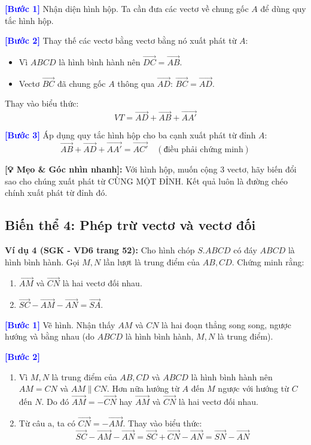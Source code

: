 \documentclass[12pt,a4paper]{article}
\begin{document}
\noindent\textbf{\textcolor{blue}{[Bước 1]}} Nhận diện hình hộp. Ta cần đưa các vectơ về chung gốc $A$ để dùng quy tắc hình hộp.

\noindent\textbf{\textcolor{blue}{[Bước 2]}} Thay thế các vectơ bằng vectơ bằng nó xuất phát từ $A$:
\begin{itemize}
    \item Vì $ABCD$ là hình bình hành nên $\vec{DC} = \vec{AB}$.
    \item Vectơ $\vec{BC}$ đã chung gốc $A$ thông qua $\vec{AD}$: $\vec{BC} = \vec{AD}$.
\end{itemize}
Thay vào biểu thức:
\[
VT = \vec{AD} + \vec{AB} + \vec{AA'}
\]

\noindent\textbf{\textcolor{blue}{[Bước 3]}} Áp dụng quy tắc hình hộp cho ba cạnh xuất phát từ đỉnh $A$:
\[
\vec{AB} + \vec{AD} + \vec{AA'} = \vec{AC'} \quad (\text{điều phải chứng minh})
\]

\noindent\textbf{[💡 Mẹo \& Góc nhìn nhanh]:} Với hình hộp, muốn cộng 3 vectơ, hãy biến đổi sao cho chúng xuất phát từ CÙNG MỘT ĐỈNH. Kết quả luôn là đường chéo chính xuất phát từ đỉnh đó.

\vspace{0.5cm}

\subsection*{Biến thể 4: Phép trừ vectơ và vectơ đối}
\textbf{Ví dụ 4 (SGK - VD6 trang 52):} Cho hình chóp $S.ABCD$ có đáy $ABCD$ là hình bình hành. Gọi $M, N$ lần lượt là trung điểm của $AB, CD$. Chứng minh rằng:
\begin{enumerate}
    \item $\vec{AM}$ và $\vec{CN}$ là hai vectơ đối nhau.
    \item $\vec{SC} - \vec{AM} - \vec{AN} = \vec{SA}$.
\end{enumerate}

\noindent\textbf{\textcolor{blue}{[Bước 1]}} Vẽ hình. Nhận thấy $AM$ và $CN$ là hai đoạn thẳng song song, ngược hướng và bằng nhau (do $ABCD$ là hình bình hành, $M,N$ là trung điểm).

\noindent\textbf{\textcolor{blue}{[Bước 2]}} 
\begin{enumerate}
    \item Vì $M,N$ là trung điểm của $AB, CD$ và $ABCD$ là hình bình hành nên $AM = CN$ và $AM \parallel CN$. Hơn nữa hướng từ $A$ đến $M$ ngược với hướng từ $C$ đến $N$. Do đó $\vec{AM} = -\vec{CN}$ hay $\vec{AM}$ và $\vec{CN}$ là hai vectơ đối nhau.
    \item Từ câu a, ta có $\vec{CN} = -\vec{AM}$. Thay vào biểu thức:
    \[
    \vec{SC} - \vec{AM} - \vec{AN} = \vec{SC} + \vec{CN} - \vec{AN} = \vec{SN} - \vec{AN}
    \]
\end{enumerate}
\end{document}
